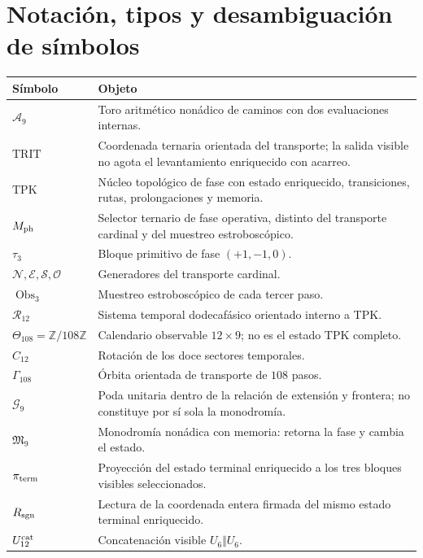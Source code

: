 \chapter*{Notación, tipos y desambiguación de símbolos}

\begin{longtable}{@{}p{}p{}@{}}
\toprule
Símbolo & Objeto \\ \midrule
\endhead
\(\mathcal A_9\)&Toro aritmético nonádico de caminos con dos evaluaciones
internas.\\
\(\mathrm{TRIT}\)&Coordenada ternaria orientada del transporte; la salida
visible no agota el levantamiento enriquecido con acarreo.\\
\(\mathrm{TPK}\)&Núcleo topológico de fase con estado enriquecido,
transiciones, rutas, prolongaciones y memoria.\\
\(M_{\rm ph}\)&Selector ternario de fase operativa, distinto del transporte
cardinal y del muestreo estroboscópico.\\
\(\tau_3\)&Bloque primitivo de fase \((+1,-1,0)\).\\
\(\mathcal N,\mathcal E,\mathcal S,\mathcal O\)&Generadores del transporte
cardinal.\\
\(\operatorname{Obs}_3\)&Muestreo estroboscópico de cada tercer paso.\\
\(\mathcal R_{12}\)&Sistema temporal dodecafásico orientado interno a TPK.\\
\(\Theta_{108}=\mathbb Z/108\mathbb Z\)&Calendario observable
\(12\times9\); no es el estado TPK completo.\\
\(C_{12}\)&Rotación de los doce sectores temporales.\\
\(\Gamma_{108}\)&Órbita orientada de transporte de \(108\) pasos.\\
\(\mathcal G_9\)&Poda unitaria dentro de la relación de extensión y
frontera; no constituye por sí sola la monodromía.\\
\(\mathfrak M_9\)&Monodromía nonádica con memoria: retorna la fase y cambia
el estado.\\
\(\pi_{\rm term}\)&Proyección del estado terminal enriquecido a los tres
bloques visibles seleccionados.\\
\(R_{\rm sgn}\)&Lectura de la coordenada entera firmada del mismo estado
terminal enriquecido.\\
\(U_{12}^{\rm cat}\)&Concatenación visible \(U_6\Vert U_6\).\\

\end{longtable}
